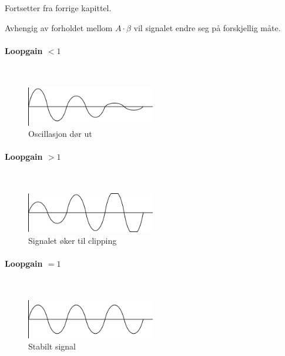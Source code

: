 Fortsetter fra forrige kapittel.

Avhengig av forholdet mellom $A \cdot \beta$ vil signalet endre seg
på forskjellig måte.

\paragraph{Loopgain $< 1$} \mbox{} \\
\begin{figure}[H]
  \caption{Oscillasjon dør ut}
  \centering
  \includegraphics[width=0.5\textwidth]{./img/fadingsignal}
\end{figure}

\paragraph{Loopgain $> 1$} \mbox{} \\
\begin{figure}[H]
  \caption{Signalet øker til clipping}
  \centering
  \includegraphics[width=0.5\textwidth]{./img/gainingsignal}
\end{figure}

\paragraph{Loopgain $= 1$} \mbox{} \\
\begin{figure}[H]
  \caption{Stabilt signal}
  \centering
  \includegraphics[width=0.5\textwidth]{./img/stabiltsignal}
\end{figure}
